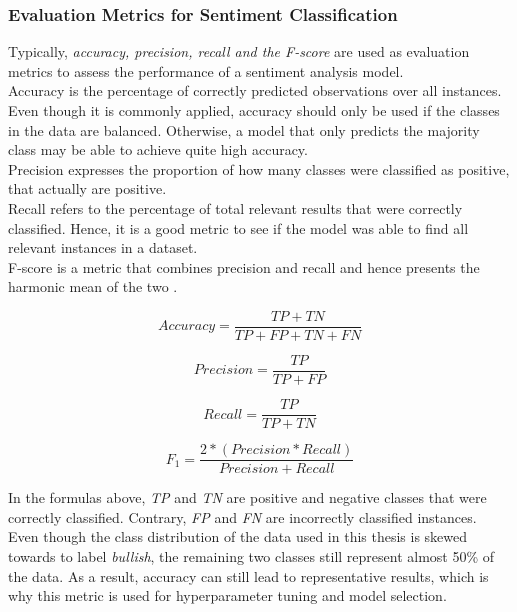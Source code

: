 \documentclass[11pt, a4paper]{article}
\begin{document}
\subsubsection{Evaluation Metrics for Sentiment Classification}
Typically, \emph{accuracy, precision, recall and the F-score} are used as evaluation metrics to assess the performance of a sentiment analysis model. \\
Accuracy is the percentage of correctly predicted observations over all instances. Even though it is commonly applied, accuracy should only be used if the classes in the data are balanced.
Otherwise, a model that only predicts the majority class may be able to achieve quite high accuracy.\\
Precision expresses the proportion of how many classes were classified as positive, that actually are positive.\\
Recall refers to the percentage of total relevant results that were correctly classified. Hence, it is a good metric to see if the model was able to find all relevant instances in a dataset.\\
F-score is a metric that combines precision and recall and hence presents the harmonic mean of the two \citep{hossin2015evaluationmetrics}.

\begin{equation*}
    Accuracy = \frac{TP+TN}{TP+FP+TN+FN}
\end{equation*}

\begin{equation*}
    Precision = \frac{TP}{TP+FP}
\end{equation*}

\begin{equation*}
    Recall = \frac{TP}{TP+TN}
\end{equation*}

\begin{equation*}
    F_{1}=\frac{2*(Precision * Recall)}{Precision + Recall}
\end{equation*}

\noindent In the formulas above, \emph{TP} and \emph{TN} are positive and negative classes that were correctly classified. Contrary, \emph{FP} and \emph{FN} are
incorrectly classified instances.\\
Even though the class distribution of the data used in this thesis is skewed towards to label \emph{bullish}, the remaining two classes still represent
almost 50\% of the data. As a result, accuracy can still lead to representative results, which is why this metric is used for hyperparameter tuning and model selection.
\end{document}

